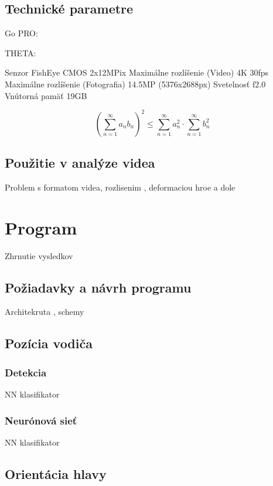\documentclass[slovak,master,dept460,male,cpp,cpdeclaration]{diploma}
\begin{document}
\subsection{Technické parametre}
Go PRO:

THETA:

Senzor	FishEye CMOS 2x12MPix
Maximálne rozlíšenie (Video)	4K  30fps
Maximálne rozlíšenie (Fotografia)	14.5MP (5376x2688px)
Svetelnosť	f2.0
Vnútorná pamäť	19GB


\begin{equation}
\left(\sum_{n=1}^{\infty}a_{n}b_{n}\right)^{2} \leq
\sum_{n=1}^{\infty}a_{n}^{2} \cdot \sum_{n=1}^{\infty}b_{n}^{2}
\label{eq:A}
\end{equation}



\newpage
\subsection{Použitie v analýze videa}
Problem s formatom videa, rozlisenim , deformaciou  hroe a dole



\newpage
\section{Program}
\label{sec:Program}
Zhrnutie vysledkov


\newpage
\subsection{Požiadavky a návrh programu}
Architekruta , schemy


\newpage
\subsection{Pozícia vodiča}


\newpage
\subsubsection{Detekcia}
NN klasifikator


\newpage
\subsubsection{Neurónová sieť}
NN klasifikator



\newpage
\subsection{Orientácia hlavy}
\end{document}
